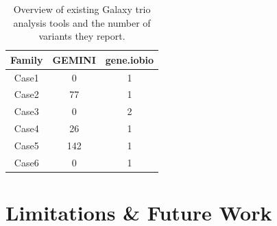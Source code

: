 \begin{table}[bt!]
    \begin{tabular}{c c c}
        \toprule
        Family & GEMINI & gene.iobio \\
        \midrule
        Case1 & 0 & 1 \\ %
        Case2 & 77 & 1 \\ %
        Case3 & 0 & 2 \\ %
        Case4 & 26 & 1 \\ %
        Case5 & 142 & 1 \\ %
        Case6 & 0 & 1 \\ %
        \bottomrule
    \end{tabular}
    \caption{Overview of existing Galaxy trio analysis tools and the number of variants they report.}\label{tab:comparison}
\end{table}

\section*{Limitations \& Future Work}
